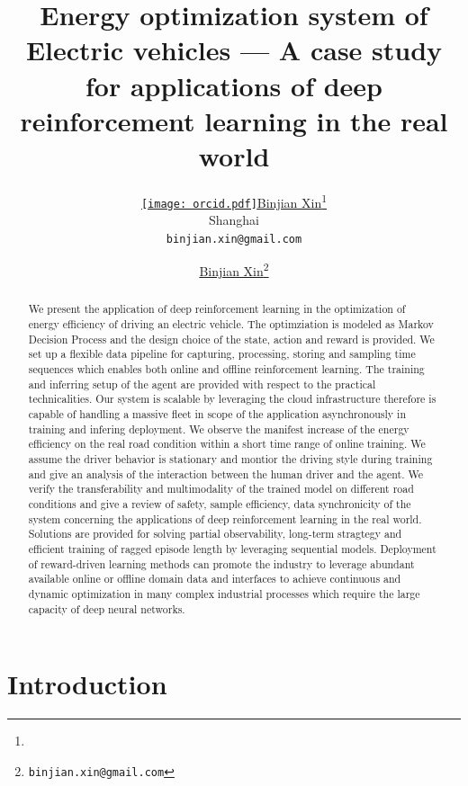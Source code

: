 \documentclass{article}
\title{Energy optimization system of Electric vehicles --- A case study for applications of deep reinforcement learning in the real world}
\author{ \href{https://orcid.org/0009-0003-0705-2612}{\texttt{[image: orcid.pdf]}\hspace{1mm}Binjian Xin}\thanks{} \\
	Shanghai\\
	\texttt{binjian.xin@gmail.com} \\
}
\author[1]{%
	\href{https://orcid.org/0009-0003-0705-2612}{\usebox{\orcid}\hspace{1mm}Binjian Xin\thanks{\texttt{binjian.xin@gmail.com}}}%
}
\affil[1]{}
\begin{document}
\maketitle

\begin{abstract}
	We present the application of deep reinforcement learning in the optimization of energy efficiency of driving an electric vehicle. The optimziation is modeled as Markov Decision Process and the design choice of the state, action and reward is provided. We set up a flexible data pipeline for capturing, processing, storing and sampling time sequences which enables both online and offline reinforcement learning. The training and inferring setup of the agent are provided with respect to the practical technicalities. Our system is scalable by leveraging the cloud infrastructure therefore is capable of handling a massive fleet in scope of the application asynchronously in training and infering deployment. We observe the manifest increase of the energy efficiency on the real road condition within a short time range of online training. We assume the driver behavior is stationary and montior the driving style during training and give an analysis of the interaction between the human driver and the agent. We verify the transferability and multimodality of the trained model on different road conditions and give a review of safety, sample efficiency, data synchronicity of the system concerning the applications of deep reinforcement learning in the real world. Solutions are provided for solving partial observability, long-term stragtegy and efficient training of ragged episode length by leveraging sequential models. Deployment of reward-driven learning methods can promote the industry to leverage abundant available online or offline domain data and interfaces to achieve continuous and dynamic optimization in many complex industrial processes which require the large capacity of deep neural networks.
\end{abstract}


\section{Introduction}\label{sec:intro}
\end{document}
